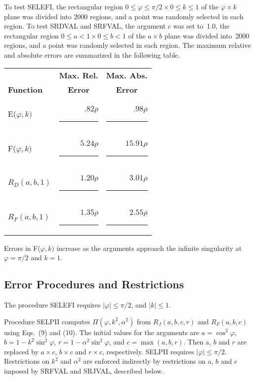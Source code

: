\documentclass[twoside]{MATH77}
\begin{document}
To test SELEFI, the rectangular region $0 \leq \varphi \leq \pi /2 \times 0
\leq k \leq 1$ of the $\varphi \times k$ plane was divided into 2000
regions, and a point was randomly selected in each region. To test SRDVAL
and SRFVAL, the argument $c$ was set to~1.0, the rectangular region $0 \leq
a < 1 \times 0 \leq b < 1$ of the $a\times b$ plane was divided into~2000
regions, and a point was randomly selected in each region. The maximum
relative and absolute errors are summarized in the following table.

\begin{center}
\begin{tabular}{lrr}
& \multicolumn{1}{c}{\bf Max. Rel.} & \multicolumn{1}{c}{\bf Max. Abs.}\\
{\bf Function} & \multicolumn{1}{c}{\bf Error} & \multicolumn{1}{c}{\bf Error}\\
E($\varphi ,k)$ & $.82\rho $\rule{.2in}{0pt} & $.98\rho $\rule{.2in}{0pt}\\
F($\varphi ,k)$ & $5.24\rho $\rule{.2in}{0pt} & $15.91\rho $\rule{.2in}{0pt}\\
$R_D(a,b,1)$ & $1.20\rho $\rule{.2in}{0pt} & $3.01\rho $\rule{.2in}{0pt}\\
$R_F(a,b,1)$ & $1.35\rho $\rule{.2in}{0pt} & $2.55\rho $\rule{.2in}{0pt}
\end{tabular}
\end{center}

Errors in F($\varphi ,k)$ increase as the arguments approach the infinite
singularity at $\varphi =\pi /2$ and $k=1.$

\nocite{Carlson:1977:SFA}



\subsection{Error Procedures and Restrictions}

The procedure SELEFI requires $|\varphi | \leq \pi /2$, and $|k| \leq 1$.

Procedure SELPII computes $\Pi (\varphi ,k^2,\alpha ^2)$ from $R_J(a,b,c,r)$
and $R_F(a,b,c)$ using Eqs.~(9) and (10). The initial values for the arguments
are $a = \cos ^2\varphi $, $b = 1-k^2\sin ^2\varphi $, $r = 1-\alpha ^2\sin
^2\varphi $, and $c = \max (a,b,r)$. Then a, $b$ and $r$ are replaced by $%
a\times c$, $b\times c$ and $r\times c$, respectively. SELPII requires $%
|\varphi | \leq \pi /2$. Restrictions on $k^2$ and $\alpha ^2$ are enforced
indirectly by restrictions on a, $b$ and $c$ imposed by SRFVAL and SRJVAL,
described below.
\end{document}
